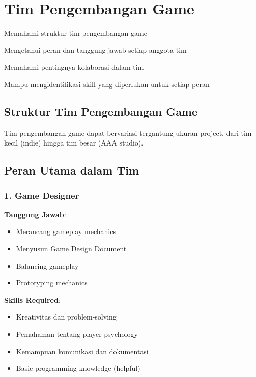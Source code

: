 
\section{Tim Pengembangan Game}

\begin{learningoutcomes}
\item Memahami struktur tim pengembangan game
\item Mengetahui peran dan tanggung jawab setiap anggota tim
\item Memahami pentingnya kolaborasi dalam tim
\item Mampu mengidentifikasi skill yang diperlukan untuk setiap peran
\end{learningoutcomes}

\subsection{Struktur Tim Pengembangan Game}

Tim pengembangan game dapat bervariasi tergantung ukuran project, dari tim kecil (indie) hingga tim besar (AAA studio).

\subsection{Peran Utama dalam Tim}

\subsubsection{1. Game Designer}

\textbf{Tanggung Jawab}:
\begin{itemize}
\item Merancang gameplay mechanics
\item Menyusun Game Design Document
\item Balancing gameplay
\item Prototyping mechanics
\end{itemize}

\textbf{Skills Required}:
\begin{itemize}
\item Kreativitas dan problem-solving
\item Pemahaman tentang player psychology
\item Kemampuan komunikasi dan dokumentasi
\item Basic programming knowledge (helpful)
\end{itemize}

